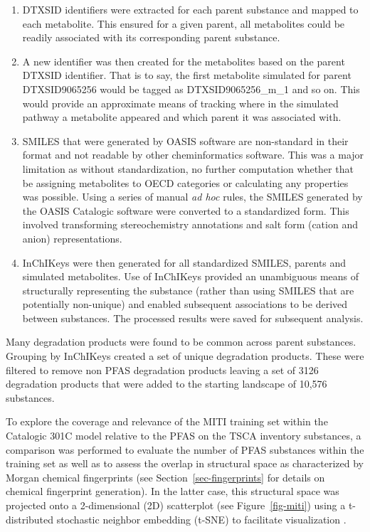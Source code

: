 \documentclass[
  super,
  preprint,
  3p]{elsarticle}
\providecommand{\tightlist}{%
  \setlength{\itemsep}{0pt}\setlength{\parskip}{0pt}}\usepackage{longtable,booktabs,array}
\begin{document}
\begin{enumerate}
\def\labelenumi{\arabic{enumi}.}
\tightlist
\item
  DTXSID identifiers were extracted for each parent substance and mapped
  to each metabolite. This ensured for a given parent, all metabolites
  could be readily associated with its corresponding parent substance.
\item
  A new identifier was then created for the metabolites based on the
  parent DTXSID identifier. That is to say, the first metabolite
  simulated for parent DTXSID9065256 would be tagged as
  DTXSID9065256\_m\_1 and so on. This would provide an approximate means
  of tracking where in the simulated pathway a metabolite appeared and
  which parent it was associated with.
\item
  SMILES that were generated by OASIS software are non-standard in their
  format and not readable by other cheminformatics software. This was a
  major limitation as without standardization, no further computation
  whether that be assigning metabolites to OECD categories or
  calculating any properties was possible. Using a series of manual
  \emph{ad hoc} rules, the SMILES generated by the OASIS Catalogic
  software were converted to a standardized form. This involved
  transforming stereochemistry annotations and salt form (cation and
  anion) representations.
\item
  InChIKeys were then generated for all standardized SMILES, parents and
  simulated metabolites. Use of InChIKeys provided an unambiguous means
  of structurally representing the substance (rather than using SMILES
  that are potentially non-unique) and enabled subsequent associations
  to be derived between substances. The processed results were saved for
  subsequent analysis.
\end{enumerate}

Many degradation products were found to be common across parent
substances. Grouping by InChIKeys created a set of unique degradation
products. These were filtered to remove non PFAS degradation products
leaving a set of 3126 degradation products that were added to the
starting landscape of 10,576 substances.

To explore the coverage and relevance of the MITI training set within
the Catalogic 301C model relative to the PFAS on the TSCA inventory
substances, a comparison was performed to evaluate the number of PFAS
substances within the training set as well as to assess the overlap in
structural space as characterized by Morgan chemical fingerprints
\citep{rogers_extended-connectivity_2010} (see
Section~\ref{sec-fingerprints} for details on chemical fingerprint
generation). In the latter case, this structural space was projected
onto a 2-dimensional (2D) scatterplot (see Figure~\ref{fig-miti}) using
a t-distributed stochastic neighbor embedding (t-SNE) to facilitate
visualization \citep{van_er_maaten_visualizing_2018}.
\end{document}

